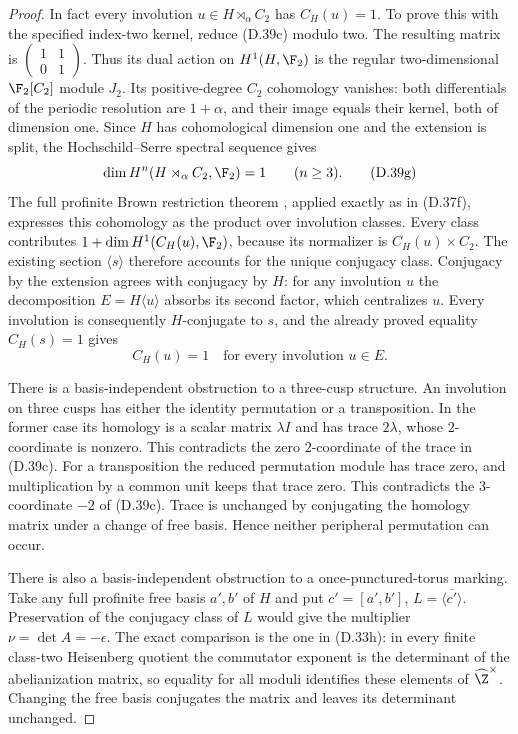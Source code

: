 \begin{proof}
In fact every involution $u\in H\rtimes_\alpha C_2$
has $C_H(u)=1$.  To prove this with the specified
index-two kernel, reduce (D.39c) modulo two.
The resulting matrix is
$\left(\begin{smallmatrix}1&1\\0&1\end{smallmatrix}\right)$.
Thus its dual action on $H^1(H,\F_2)$ is the
regular two-dimensional $\F_2[C_2]$ module $J_2$.
Its positive-degree $C_2$ cohomology vanishes:
both differentials of the periodic resolution are
$1+\alpha$, and their image equals their kernel,
both of dimension one.
Since $H$ has cohomological dimension one and
the extension is split, the Hochschild--Serre
spectral sequence gives
\[
       \dim H^n(H\rtimes_\alpha C_2,\F_2)=1
                        \qquad(n\geq3).                 \tag{D.39g}
\]
The full profinite Brown restriction theorem
\cite[Theorem 2 and \S1.1]{A-KochloukovaZalesskii2007},
applied exactly as in (D.37f), expresses this
cohomology as the product over involution classes.
Every class contributes
$1+\dim H^1(C_H(u),\F_2)$, because its normalizer
is $C_H(u)\times C_2$.
The existing section $\langle s\rangle$ therefore
accounts for the unique conjugacy class.
Conjugacy by the extension agrees with conjugacy
by $H$: for any involution $u$ the decomposition
$E=H\langle u\rangle$ absorbs its second factor,
which centralizes $u$.
Every involution is consequently $H$-conjugate
to $s$, and the already proved equality
$C_H(s)=1$ gives
\[
                  C_H(u)=1
           \quad\text{for every involution }u\in E.     \tag{D.39h}
\]

There is a basis-independent obstruction
to a three-cusp structure.  An involution
on three cusps has either the identity
permutation or a transposition.
In the former case its homology is a
scalar matrix $\lambda I$ and has trace
$2\lambda$, whose $2$-coordinate is
nonzero.  This contradicts the zero
$2$-coordinate of the trace in (D.39c).
For a transposition the reduced
permutation module has trace zero, and
multiplication by a common unit keeps
that trace zero.  This contradicts the
$3$-coordinate $-2$ of (D.39c).
Trace is unchanged by conjugating the
homology matrix under a change of free
basis.  Hence neither peripheral
permutation can occur.

There is also a basis-independent obstruction
to a once-punctured-torus marking.
Take any full profinite free basis $a',b'$ of
$H$ and put $c'=[a',b']$,
$L=\overline{\langle c'\rangle}$.
Preservation of the conjugacy class of $L$
would give the multiplier
$\nu=\det A=-\epsilon$.
The exact comparison is the one in
(D.33h): in every finite class-two
Heisenberg quotient the commutator
exponent is the determinant of the
abelianization matrix, so equality for
all moduli identifies these elements
of $\widehat\Z^\times$.
Changing the free basis conjugates the
matrix and leaves its determinant unchanged.


\end{proof}
